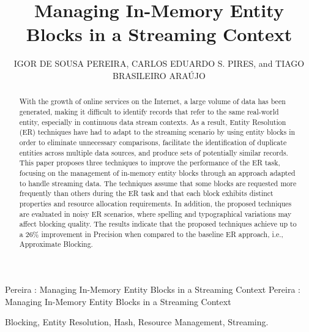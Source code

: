 \documentclass{ieeeaccess}
\begin{document}

\title{Managing In-Memory Entity Blocks in a Streaming Context}
\author{\uppercase{Igor de Sousa Pereira}, \uppercase{Carlos Eduardo S. Pires}, and \uppercase{Tiago Brasileiro Ara\'ujo}}

\address[1]{Department of Systems and Computing, Federal University of Campina Grande, Para\'iba, Brazil (e-mail: igor.pereira@copin.ufcg.edu.br; cesp@dsc.ufcg.edu.br)}
\address[2]{Federal Institute of Para\'iba, Soledade, Para\'iba, Brazil (e-mail: tiago.brasileiro@ifpb.edu.br)}

\markboth
{Pereira \headeretal: Managing In-Memory Entity Blocks in a Streaming Context}
{Pereira \headeretal: Managing In-Memory Entity Blocks in a Streaming Context}


\begin{abstract}
With the growth of online services on the Internet, a large volume of data has been generated, making it difficult to identify records that refer to the same real-world entity, especially in continuous data stream contexts. As a result, Entity Resolution (ER) techniques have had to adapt to the streaming scenario by using entity blocks in order to eliminate unnecessary comparisons, facilitate the identification of duplicate entities across multiple data sources, and produce sets of potentially similar records. This paper proposes three techniques to improve the performance of the ER task, focusing on the management of in-memory entity blocks through an approach adapted to handle streaming data. The techniques assume that some blocks are requested more frequently than others during the ER task and that each block exhibits distinct properties and resource allocation requirements. In addition, the proposed techniques are evaluated in noisy ER scenarios, where spelling and typographical variations may affect blocking quality. The results indicate that the proposed techniques achieve up to a 26\% improvement in Precision when compared to the baseline ER approach, i.e., Approximate Blocking.
\end{abstract}

\begin{keywords}
Blocking, Entity Resolution, Hash, Resource Management, Streaming.
\end{keywords}
\end{document}
